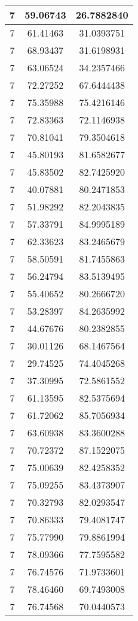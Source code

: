 \documentclass[
]{book}
\begin{document}
\begin{tabular}{c|c|c}
\hline
7 & 59.06743 & 26.7882840\\
\hline
7 & 61.41463 & 31.0393751\\
\hline
7 & 68.93437 & 31.6198931\\
\hline
7 & 63.06524 & 34.2357466\\
\hline
7 & 72.27252 & 67.6444438\\
\hline
7 & 75.35988 & 75.4216146\\
\hline
7 & 72.83363 & 72.1146938\\
\hline
7 & 70.81041 & 79.3504618\\
\hline
7 & 45.80193 & 81.6582677\\
\hline
7 & 45.83502 & 82.7425920\\
\hline
7 & 40.07881 & 80.2471853\\
\hline
7 & 51.98292 & 82.2043835\\
\hline
7 & 57.33791 & 84.9995189\\
\hline
7 & 62.33623 & 83.2465679\\
\hline
7 & 58.50591 & 81.7455863\\
\hline
7 & 56.24794 & 83.5139495\\
\hline
7 & 55.40652 & 80.2666720\\
\hline
7 & 53.28397 & 84.2635992\\
\hline
7 & 44.67676 & 80.2382855\\
\hline
7 & 30.01126 & 68.1467564\\
\hline
7 & 29.74525 & 74.4045268\\
\hline
7 & 37.30995 & 72.5861552\\
\hline
7 & 61.13595 & 82.5375694\\
\hline
7 & 61.72062 & 85.7056934\\
\hline
7 & 63.60938 & 83.3600288\\
\hline
7 & 70.72372 & 87.1522075\\
\hline
7 & 75.00639 & 82.4258352\\
\hline
7 & 75.09255 & 83.4373907\\
\hline
7 & 70.32793 & 82.0293547\\
\hline
7 & 70.86333 & 79.4081747\\
\hline
7 & 75.77990 & 79.8861994\\
\hline
7 & 78.09366 & 77.7595582\\
\hline
7 & 76.74576 & 71.9733601\\
\hline
7 & 78.46460 & 69.7493008\\
\hline
7 & 76.74568 & 70.0440573\\

\end{tabular}
\end{document}

